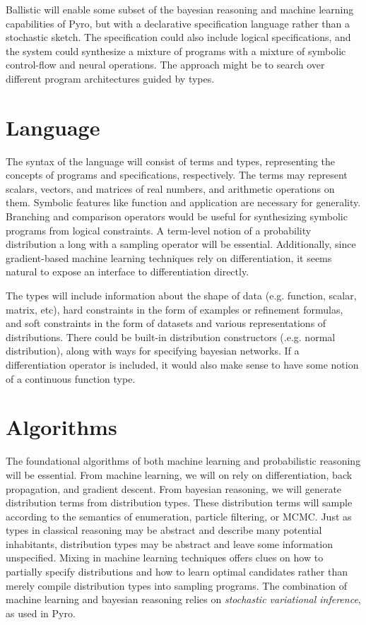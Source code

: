 \documentclass[runningheads]{llncs}
\begin{document}
Ballistic will enable some subset of the bayesian reasoning and machine learning capabilities of Pyro,
but with a declarative specification language rather than a stochastic sketch. 
The specification could also include logical specifications, and the system could synthesize a mixture of 
programs with a mixture of symbolic control-flow and neural operations.
The approach might be to search over different program architectures guided by types.


\section{Language}
The syntax of the language will consist of terms and types, representing the concepts of programs and specifications, respectively. 
The terms may represent scalars, vectors, and matrices of real numbers, and arithmetic operations on them. 
Symbolic features like function and application are necessary for generality.
Branching and comparison operators would be useful for synthesizing symbolic programs from logical constraints. 
A term-level notion of a probability distribution a long with a sampling operator will be essential.
Additionally, since gradient-based machine learning techniques rely on differentiation, 
it seems natural to expose an interface to differentiation directly.

The types will include information about the shape of data (e.g. function, scalar, matrix, etc), 
hard constraints in the form of examples or refinement formulas, 
and soft constraints in the form of datasets and various representations of distributions.
There could be built-in distribution constructors (.e.g. normal distribution), 
along with ways for specifying bayesian networks. 
If a differentiation operator is included, it would also make sense to have some notion of a continuous function type.


\section{Algorithms}
The foundational algorithms of both machine learning and probabilistic reasoning will be essential. 
From machine learning, we will on rely on differentiation, back propagation, and gradient descent. 
From bayesian reasoning, we will generate distribution terms from distribution types.   
These distribution terms will sample according to the semantics of enumeration, particle filtering, or MCMC. 
Just as types in classical reasoning may be abstract and describe many potential inhabitants, 
distribution types may be abstract and leave some information unspecified.  
Mixing in machine learning techniques offers clues on how to partially specify distributions
and how to learn optimal candidates rather than merely compile distribution types into sampling programs. 
The combination of machine learning and bayesian reasoning relies on \emph{stochastic variational inference}, as used in Pyro.
\end{document}
